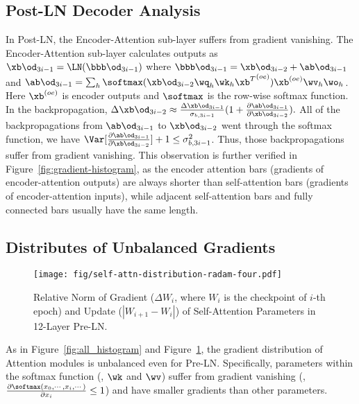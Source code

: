 



\subsection{Post-LN Decoder Analysis}
\label{subsec:postln_decoder_analysis}
In Post-LN, the Encoder-Attention sub-layer suffers from gradient vanishing. 
The Encoder-Attention sub-layer calculates outputs as 
$\xb\od_{3i-1} = \LN(\bbb\od_{3i-1})$ where $\bbb\od_{3i-1} = \xb\od_{3i-2} + \ab\od_{3i-1}$ and $\ab\od_{3i-1} = \sum_{h} \softmax(\xb\od_{3i-2} \wq_h \wk_h {\xb^T}^{(oe)})\xb^{(oe)} \wv_h \wo_h$. 
Here $\xb^{(oe)}$ is encoder outputs and $\softmax$ is the row-wise softmax function. 
In the backpropagation, $\Delta \xb\od_{3i-2} \approx \frac{\Delta \xb\od_{3i-1}}{\sigma_{b, 3i-1}} (1 + 
\frac{\partial \ab\od_{3i-1} }{\partial \xb\od_{3i-2}}).$
All of the backpropagations from $\ab\od_{3i-1} $ to $\xb\od_{3i-2}$ went through the softmax function, we have $\Var[\frac{\partial \ab\od_{3i-1} }{\partial \xb\od_{3i-2}}] + 1 \leq \sigma^2_{b, 3i-1}$. 
Thus, those backpropagations suffer from gradient vanishing. 
This observation is further verified in Figure~\ref{fig:gradient-histogram}, as the encoder attention bars (gradients of encoder-attention outputs) are always shorter than self-attention bars (gradients of encoder-attention inputs), while adjacent self-attention bars and fully connected bars usually have the same length. 


\subsection{Distributes of Unbalanced Gradients}
\label{subsec:attention_gradients}

\begin{figure}[t]
\centering
\texttt{[image: fig/self-attn-distribution-radam-four.pdf]}
\caption{
Relative Norm of Gradient ($\Delta W_i$, where $W_i$ is the checkpoint of $i$-th epoch) and Update ($|W_{i+1} - W_i|$) of Self-Attention Parameters in 12-Layer Pre-LN.
}
\label{fig:update-with-gradient-four}
\end{figure}

As in Figure~\ref{fig:all_histogram} and Figure~\ref{fig:update-with-gradient-four}, the gradient distribution of Attention modules is unbalanced even for Pre-LN. 
Specifically, parameters within the softmax function (\ie, $\wk$ and $\wv$) suffer from gradient vanishing (\ie, $\frac{\partial \softmax(x_0, \cdots, x_i, \cdots)}{\partial x_i} \leq 1$) and have smaller gradients than other parameters.

